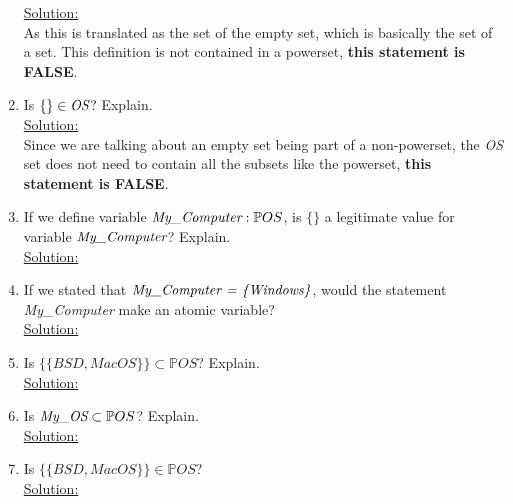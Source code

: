 \begin{enumerate}
  \noindent\underline{Solution:}\\ As this is translated as the set of the empty set, which is basically the set of a set. This definition is not contained in a powerset, \textbf{this statement is FALSE}.
  \item Is $\{ \} \in \emph{OS}$? Explain.\\
  \noindent\underline{Solution:}\\ Since we are talking about an empty set being part of a non-powerset, the \emph{OS} set does not need to contain all the subsets like the powerset, \textbf{this statement is FALSE}.
  \item If we define variable $\emph{My\_Computer} : \mathbb{P}OS$, is $\{ \}$ a legitimate value for variable  $\emph{My\_Computer}$? Explain.\\
  \noindent\underline{Solution:}\\
  \item If we stated that $\emph{{My\_Computer} = \{Windows\}}$, would the statement \emph{My\_Computer} make an atomic variable?\\
  \noindent\underline{Solution:}\\
  \item Is $\{\{BSD, MacOS\}\} \subset \mathbb{P}OS$? Explain.\\
  \noindent\underline{Solution:}\\
  \item Is $\emph{My\_OS} \subset \mathbb{P}OS$? Explain.\\
  \noindent\underline{Solution:}\\
  \item Is $\{{\{BSD, MacOS\}\}} \in \mathbb{P}OS$?\\
  \noindent\underline{Solution:}\\

  

\end{enumerate}

